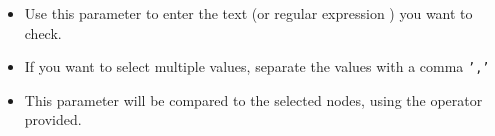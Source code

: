 
\begin{itemize}
\item Use this parameter to enter the text (or regular expression ) you want to check. 
\item If you want to select multiple values, separate the values with a comma {\tt ','}
\item This parameter will be compared to the selected nodes, using the operator provided.
\end{itemize}
